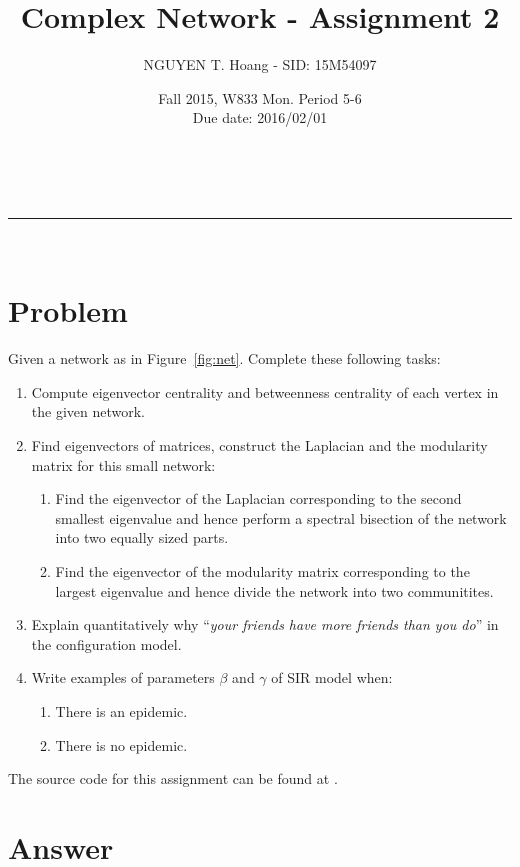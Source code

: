 \documentclass[a4paper,12pt]{article}
\makeatletter
\newcommand{\linia}{\rule{\linewidth}{0.5pt}}
\renewcommand{\maketitle} {%
\begin{center}
\vspace{2ex}
{\huge \textsc{\@title}}
\vspace{1ex}
\\
\linia\\
\@author \hfill \@date
\vspace{4ex}
\end{center}
}
\makeatother
\begin{document}

\title{Complex Network - Assignment 2}

\author{NGUYEN T. Hoang - SID: 15M54097}

\date{Fall 2015, W833 Mon. Period 5-6 \\ \hfill Due date: 2016/02/01}

\maketitle

\vspace{2em}
\section*{Problem}
\noindent
Given a network as in Figure~\ref{fig:net}. Complete these following tasks:
\begin{enumerate}
    \item Compute eigenvector centrality and betweenness centrality of each vertex in the given network.
    \item Find eigenvectors of matrices, construct the Laplacian and the modularity matrix for this small network:
    \begin{enumerate}
        \item Find the eigenvector of the Laplacian corresponding to the second smallest eigenvalue and hence perform a spectral bisection of the network into two equally sized parts.
        \item Find the eigenvector of the modularity matrix corresponding to the largest eigenvalue and hence divide the network into two communitites.
    \end{enumerate}
    \item Explain quantitatively why ``\emph{your friends have more friends than you do}'' in the configuration model.
    \item Write examples of parameters $\beta$ and $\gamma$ of SIR model when:
    \begin{enumerate}
        \item There is an epidemic.
        \item There is no epidemic.
    \end{enumerate}
\end{enumerate}

\noindent
The source code for this assignment can be found at \cite{mgit}.
\pagebreak
\section*{Answer}
\end{document}
